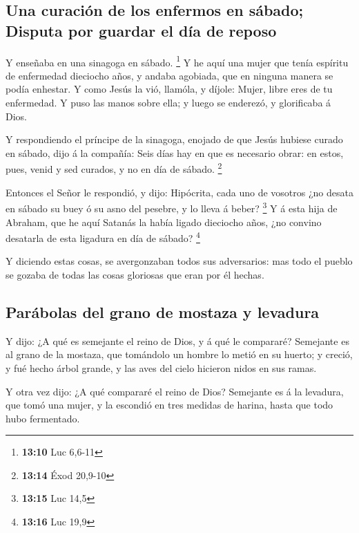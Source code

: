 \hypertarget{una-curaciuxf3n-de-los-enfermos-en-suxe1bado-disputa-por-guardar-el-duxeda-de-reposo}{%
\subsection{Una curación de los enfermos en sábado; Disputa por guardar
el día de
reposo}\label{una-curaciuxf3n-de-los-enfermos-en-suxe1bado-disputa-por-guardar-el-duxeda-de-reposo}}

 Y enseñaba en una sinagoga en sábado. \footnote{\textbf{13:10}
  Luc 6,6-11}  Y he aquí una mujer que tenía espíritu de
enfermedad dieciocho años, y andaba agobiada, que en ninguna manera se
podía enhestar.  Y como Jesús la vió, llamóla, y díjole:
Mujer, libre eres de tu enfermedad.  Y puso las manos sobre
ella; y luego se enderezó, y glorificaba á Dios.

 Y respondiendo el príncipe de la sinagoga, enojado de que
Jesús hubiese curado en sábado, dijo á la compañía: Seis días hay en que
es necesario obrar: en estos, pues, venid y sed curados, y no en día de
sábado. \footnote{\textbf{13:14} Éxod 20,9-10}

 Entonces el Señor le respondió, y dijo: Hipócrita, cada
uno de vosotros ¿no desata en sábado su buey ó su asno del pesebre, y lo
lleva á beber? \footnote{\textbf{13:15} Luc 14,5}  Y á esta
hija de Abraham, que he aquí Satanás la había ligado dieciocho años, ¿no
convino desatarla de esta ligadura en día de sábado? \footnote{\textbf{13:16}
  Luc 19,9}

 Y diciendo estas cosas, se avergonzaban todos sus
adversarios: mas todo el pueblo se gozaba de todas las cosas gloriosas
que eran por él hechas.

\hypertarget{paruxe1bolas-del-grano-de-mostaza-y-levadura}{%
\subsection{Parábolas del grano de mostaza y
levadura}\label{paruxe1bolas-del-grano-de-mostaza-y-levadura}}

 Y dijo: ¿A qué es semejante el reino de Dios, y á qué le
compararé?  Semejante es al grano de la mostaza, que
tomándolo un hombre lo metió en su huerto; y creció, y fué hecho árbol
grande, y las aves del cielo hicieron nidos en sus ramas.

 Y otra vez dijo: ¿A qué compararé el reino de Dios?
 Semejante es á la levadura, que tomó una mujer, y la
escondió en tres medidas de harina, hasta que todo hubo fermentado.

